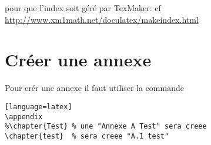 pour que l'index soit g\'er\'e par TexMaker:
cf \url{http://www.xm1math.net/doculatex/makeindex.html}




\section{Cr\'eer une annexe}

Pour cr\'er une annexe il faut utiliser la commande
\begin{lstlisting}[caption={Cr\'eer une annexe}] [language=latex]
\appendix		
%\chapter{Test}	% une "Annexe A Test" sera creee
\chapter{test}	% sera creee "A.1 test"
\end{lstlisting}
